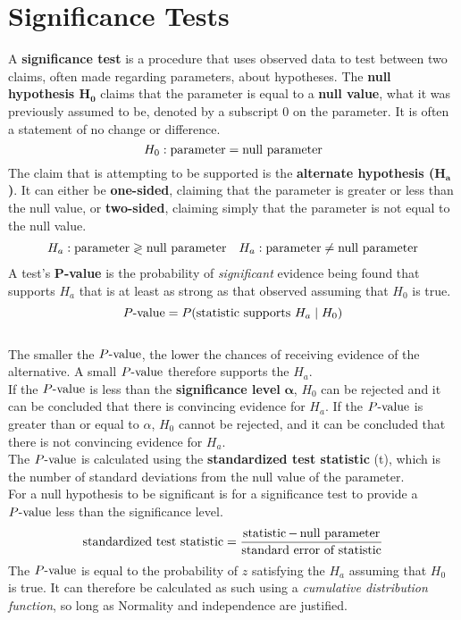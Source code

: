 \documentclass[../AP_Statistics.tex]{subfiles}
\begin{document}
	\chapter{Significance Tests}
		A \textbf{significance test} is a procedure that uses observed data to test between two claims, often made regarding parameters, about hypotheses.
		The \textbf{null hypothesis $\bm{H_0}$} claims that the parameter is equal to a \textbf{null value}, what it was previously assumed to be, denoted by a subscript $0$ on the parameter. It is often a statement of no change or difference.
		\[H_0: \operatorname{parameter} = \operatorname{\text{null parameter}}\]
		The claim that is attempting to be supported is the \textbf{alternate hypothesis ($\bm{H_a}$)}. It can either be \textbf{one-sided}, claiming that the parameter is greater or less than the null value, or \textbf{two-sided}, claiming simply that the parameter is not equal to the null value.
		\begin{align*}
			H_a&: \operatorname{parameter} \gtrless \operatorname{\text{null parameter}} & H_a: \operatorname{parameter} \ne \operatorname{\text{null parameter}}
		\end{align*}
		A test's $\bm{P}$\textbf{-value} is the probability of \emph{significant} evidence being found that supports $H_a$ that is at least as strong as that observed assuming that $H_0$ is true.
		\[P\text{-value} = P(\text{statistic supports } H_a \mid H_0)\] \\
		The smaller the $P\text{-value}$, the lower the chances of receiving evidence of the alternative. A small $P\text{-value}$ therefore supports the $H_a$. \\
		If the $P\text{-value}$ is less than the \textbf{significance level} $\bm{\alpha}$, $H_0$ can be rejected and it can be concluded that there is convincing evidence for $H_a$. If the $P\text{-value}$ is greater than or equal to $\alpha$, $H_0$ cannot be rejected, and it can be concluded that there is not convincing evidence for $H_a$. \\
		The $P\text{-value}$ is calculated using the \textbf{standardized test statistic} (t), which is the number of standard deviations from the null value of the parameter. \\
		For a null hypothesis to be significant is for a significance test to provide a $P\text{-value}$ less than the significance level.
		\[\operatorname{\text{standardized test statistic}} = \frac{\operatorname{statistic} - \operatorname{\text{null parameter}}}{\text{standard error of statistic}}\]
		The $P\text{-value}$ is equal to the probability of $z$ satisfying the $H_a$ assuming that $H_0$ is true. It can therefore be calculated as such using a \emph{cumulative distribution function}, so long as Normality and independence are justified.
\end{document}
